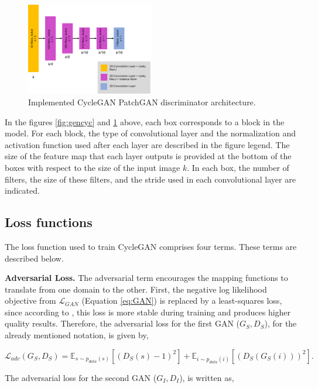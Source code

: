 \begin{figure}[!htb]
  \centering
  \includegraphics[width=0.50\textwidth]{Images/discriminator_cyclegan.jpg}
  \caption{Implemented CycleGAN PatchGAN discriminator architecture.}
  \label{fig:disccyc}
\end{figure}

In the figures \ref{fig:gencyc} and \ref{fig:disccyc} above, each box corresponds to a block in the model. For each block, the type of convolutional layer and the normalization and activation function used after each layer are described in the figure legend. The size of the feature map that each layer outputs is provided at the bottom of the boxes with respect to the size of the input image $k$. In each box, the number of filters, the size of these filters, and the stride used in each convolutional layer are indicated.

\subsection*{Loss functions}

The loss function used to train CycleGAN comprises four terms. These terms are described below.

\textbf{Adversarial Loss.} The adversarial term encourages the mapping functions to translate from one domain to
the other. First, the negative log likelihood objective from $\mathcal{L}_{GAN}$  (Equation \ref{eq:GAN}) is replaced by a least-squares loss, since according to \cite{cycleGAN:original}, this loss is more stable during training and produces higher quality results. Therefore, the adversarial loss for the first GAN ($G_{S}, D_S$), for the already mentioned notation, is given by,

\begin{equation}
    \mathcal{L}_{adv}(G_{S},D_S) = \mathbb{E}_{s \sim p_{data}(s)} [(D_S(s)-1)^2] + \mathbb{E}_{i \sim p_{data}(i)} [(D_S(G_{S}(i)))^2].
\end{equation}

The adversarial loss for the second GAN ($G_{I}, D_I$), is written as,

